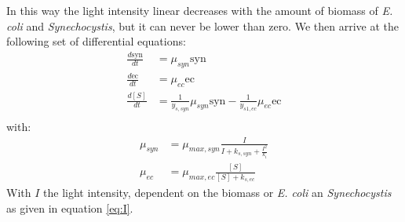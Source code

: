 \documentclass[12pt]{report}
\begin{document}
In this way the light intensity linear decreases with the amount of biomass of \textit{E. coli} and \textit{Synechocystis}, but it can never be lower than zero.
We then arrive at the following set of differential equations:
\begin{align}
 \frac{d\text{syn}}{dt} &= \mu_{syn} \text{syn} \\
 \frac{d\text{ec}}{dt} &= \mu_{ec} \text{ec} \\
 \frac{d[S]}{dt} &= \frac{1}{y_{s,syn}} \mu_{syn} \text{syn} - \frac{1}{y_{s1,ec}} \mu_{ec} \text{ec} \\
\end{align}
with:
\begin{align}
 \mu_{syn} &= \mu_{max,syn} \frac{I}{I+k_{s,syn}+\frac{I^2}{k_{i}}}\\
 \mu_{ec} &= \mu_{max,ec} \frac{[S]}{[S]+k_{s,ec}}
 \end{align}
With $I$ the light intensity, dependent on the biomass or \textit{E. coli} an \textit{Synechocystis} as given in equation \ref{eq:I}.
\end{document}
